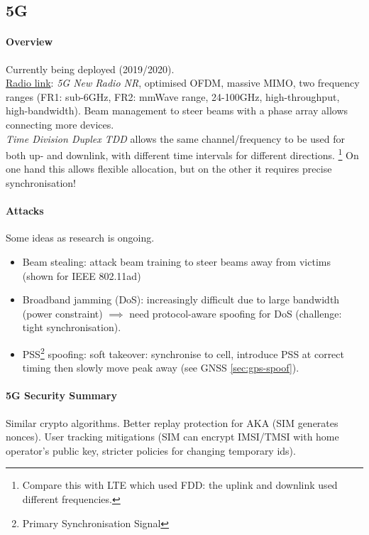 \subsection{5G}

\paragraph{Overview}
Currently being deployed (2019/2020).
\\
\underline{Radio link}: \textit{5G New Radio NR}, optimised OFDM, massive MIMO, two frequency ranges (FR1: sub-6GHz, FR2: mmWave range, 24-100GHz, high-throughput, high-bandwidth).
Beam management to steer beams with a phase array allows connecting more devices.
\\
\textit{Time Division Duplex TDD} allows the same channel/frequency to be used for both up- and downlink, with different time intervals for different directions.%
\footnote{Compare this with LTE which used FDD: the uplink and downlink used different frequencies.}
On one hand this allows flexible allocation, but on the other it requires precise synchronisation!

\paragraph{Attacks}
Some ideas as research is ongoing.
\begin{itemize}
	\item Beam stealing: attack beam training to steer beams away from victims (shown for IEEE 802.11ad)
	\item Broadband jamming (DoS): increasingly difficult due to large bandwidth (power constraint) $\implies$ need protocol-aware spoofing for DoS (challenge: tight synchronisation).
	\item PSS\footnote{Primary Synchronisation Signal} spoofing:
	soft takeover: synchronise to cell, introduce PSS at correct timing then slowly move peak away (see GNSS \autoref{sec:gps-spoof}).
\end{itemize}

\paragraph{5G Security Summary}
Similar crypto algorithms.
Better replay protection for AKA (SIM generates nonces).
User tracking mitigations (SIM can encrypt IMSI/TMSI with home operator's public key, stricter policies for changing temporary ids).

